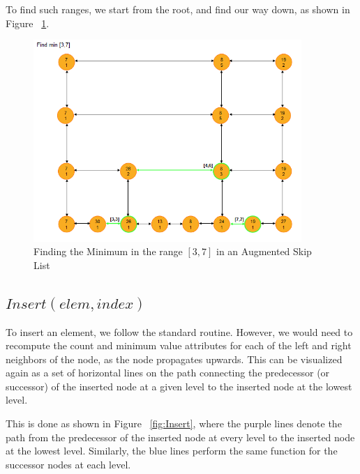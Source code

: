 \documentclass{article}
\begin{document}
To find such ranges, we start from the root, and find our way down, as
shown in Figure ~\ref{fig:MinInRange}.

\begin{figure}[h!]
  \begin{center}
    \includegraphics[width=4in]{images/MinInRange.jpg}
    \caption{Finding the Minimum in the range $[3,7]$ in an Augmented Skip List}
    \label{fig:MinInRange}
  \end{center}
\end {figure}

\clearpage

\subsection{$Insert(elem, index)$}

To insert an element, we follow the standard routine. However, we
would need to recompute the count and minimum value attributes for
each of the left and right neighbors of the node, as the node
propagates upwards. This can be visualized again as a set of
horizontal lines on the path connecting the predecessor (or successor)
of the inserted node at a given level to the inserted node at the
lowest level.

This is done as shown in Figure ~\ref{fig:Insert}, where the purple lines denote
the path from the predecessor of the inserted node at every level to
the inserted node at the lowest level.  Similarly, the blue lines
perform the same function for the successor nodes at each level.
\end{document}
